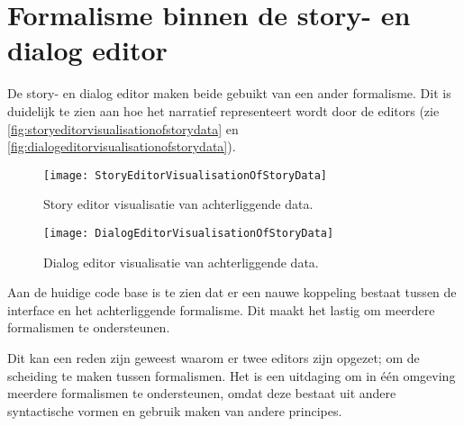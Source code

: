 \section{Formalisme binnen de story- en dialog editor}
De story- en dialog editor maken beide gebuikt van een ander formalisme. Dit is duidelijk te zien aan hoe het narratief representeert wordt door de editors (zie \autoref{fig:storyeditorvisualisationofstorydata} en \autoref{fig:dialogeditorvisualisationofstorydata}). 


\begin{figure}[htb]
    \centering
    \texttt{[image: StoryEditorVisualisationOfStoryData]}
    \caption{Story editor visualisatie van achterliggende data.}
    \label{fig:storyeditorvisualisationofstorydata}
\end{figure}

\begin{figure}[htb]
    \centering
    \texttt{[image: DialogEditorVisualisationOfStoryData]}
    \caption{Dialog editor visualisatie van achterliggende data.}
    \label{fig:dialogeditorvisualisationofstorydata}
\end{figure}

Aan de huidige code base is te zien dat er een nauwe koppeling bestaat tussen de interface en het achterliggende formalisme. Dit maakt het lastig om meerdere formalismen te ondersteunen.

Dit kan een reden zijn geweest waarom er twee editors zijn opgezet; om de scheiding te maken tussen formalismen. Het is een uitdaging om in één omgeving meerdere formalismen te ondersteunen, omdat deze bestaat uit andere syntactische vormen en gebruik maken van andere principes.

